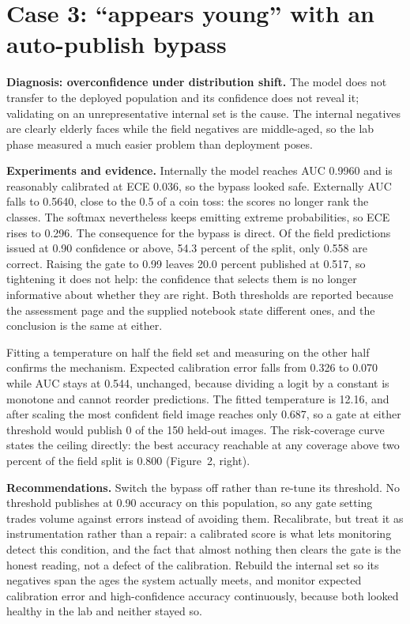 \documentclass[10pt,a4paper,twocolumn]{article}
\begin{document}
\section{Case 3: ``appears young'' with an auto-publish bypass}
\textbf{Diagnosis: overconfidence under distribution shift.} The model does not transfer to the
deployed population and its confidence does not reveal it; validating on an unrepresentative
internal set is the cause. The internal negatives are clearly elderly faces while the field negatives are
middle-aged, so the lab phase measured a much easier problem than deployment poses.

\textbf{Experiments and evidence.} Internally the model reaches AUC 0.9960 and is reasonably calibrated at ECE
0.036, so the bypass looked safe. Externally AUC falls to 0.5640, close to the 0.5 of a
coin toss: the scores no longer rank the classes. The softmax nevertheless keeps emitting extreme
probabilities, so ECE rises to 0.296. The consequence for the bypass is direct. Of the field
predictions issued at 0.90 confidence or above, 54.3 percent of the split, only
0.558 are correct. Raising the gate to 0.99 leaves 20.0 percent published at
0.517, so tightening it does not help: the confidence that selects them is no longer
informative about whether they are right. Both thresholds are reported because the assessment page
and the supplied notebook state different ones, and the conclusion is the same at either.

Fitting a temperature on half the field set and measuring on the other half confirms the mechanism.
Expected calibration error falls from 0.326 to 0.070 while AUC stays at
0.544, unchanged, because dividing a logit by a constant is monotone and cannot reorder
predictions. The fitted temperature is 12.16, and after scaling the most confident field
image reaches only 0.687, so a gate at either threshold would publish 0 of the
150 held-out images. The risk-coverage curve states the ceiling directly: the best accuracy
reachable at any coverage above two percent of the field split is 0.800 (Figure~2, right).

\textbf{Recommendations.} Switch the bypass off rather than re-tune its threshold. No threshold
publishes at 0.90 accuracy on this population, so any gate setting trades volume against errors
instead of avoiding them. Recalibrate, but treat it as instrumentation rather than a repair: a
calibrated score is what lets monitoring detect this condition, and the fact that almost nothing
then clears the gate is the honest reading, not a defect of the calibration. Rebuild the internal
set so its negatives span the ages the system actually meets, and monitor expected calibration
error and high-confidence accuracy continuously, because both looked healthy in the lab and neither
stayed so.
\end{document}
